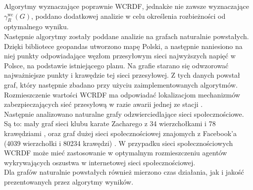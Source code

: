 Algorytmy wyznaczające poprawnie WCRDF, jednakże nie zawsze wyznaczające $\gamma_{R}^{\text{wc}}(G)$, poddano dodatkowej analizie w celu określenia rozbieżności od optymalnego wyniku.\\

Następnie algorytmy zostały poddane analizie na grafach naturalnie powstałych.
Dzięki bibliotece geopandas utworzono mapę Polski, a następnie naniesiono na niej punkty odpowiadające węzłom przesyłowym sieci najwyższych napięć w Polsce, na podstawie istniejącego planu. Na grafie starano się odwzorować najważniejsze punkty i krawędzie tej sieci przesyłowej. Z tych danych powstał graf, który następnie zbadano przy użyciu zaimplementowanych algorytmów. Rozmieszczenie wartości WCRDF ma odpowiadać lokalizacjom mechanizmów zabezpieczających sieć przesyłową w razie awarii jednej ze stacji \cite{POLAND}.\\

Następnie analizowano naturalne grafy odzwierciedlające sieci społecznościowe. Są to: mały graf sieci klubu karate Zacharego z 34 wierzchołkami i 78 krawędziami \cite{KARATE}, oraz graf dużej sieci społecznościowej znajomych z Facebook'a (4039 wierzchołki i 80234 krawędzi) \cite{FACEBOOK}. W przypadku sieci społecznościowych WCRDF może mieć zastosowanie w optymalnym rozmieszczeniu agentów wykrywających oszustwa w internetowej sieci społecznościowej.\\

Dla grafów naturalnie powstałych również mierzono czas działania, jak i jakość prezentowanych przez algorytmy wyników.



